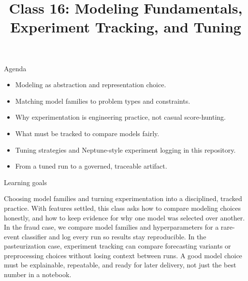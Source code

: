

\title{Class 16: Modeling Fundamentals, Experiment Tracking, and Tuning}
\author{\coursename}
\date{}



\frame{\titlepage \coursefooter}

\begin{frame}{Agenda}
\begin{itemize}
\item Modeling as abstraction and representation choice.
\item Matching model families to problem types and constraints.
\item Why experimentation is engineering practice, not casual score-hunting.
\item What must be tracked to compare models fairly.
\item Tuning strategies and Neptune-style experiment logging in this repository.
\item From a tuned run to a governed, traceable artifact.
\end{itemize}
\coursefooter
\end{frame}

\begin{frame}{Learning goals}
\coursefooter
\end{frame}

\coursecontextframe
{Choosing model families and turning experimentation into a disciplined, tracked practice.}
{With features settled, this class asks how to compare modeling choices honestly, and how to keep evidence for why one model was selected over another.}
{In the fraud case, we compare model families and hyperparameters for a rare-event classifier and log every run so results stay reproducible.}
{In the pasteurization case, experiment tracking can compare forecasting variants or preprocessing choices without losing context between runs.}
{A good model choice must be explainable, repeatable, and ready for later delivery, not just the best number in a notebook.}

